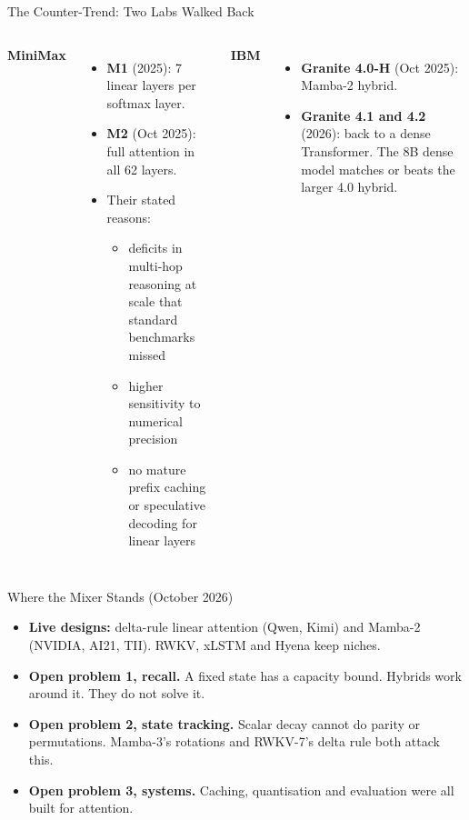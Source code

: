 \begin{frame}{The Counter-Trend: Two Labs Walked Back}
    \begin{columns}[T,onlytextwidth]
        \textbf{MiniMax}
        \begin{itemize}\itemsep0.3em
            \item \textbf{M1} (2025): 7 linear layers per softmax layer.
            \item \textbf{M2} (Oct 2025): \alert{full attention in all 62 layers}.
            \item Their stated reasons:
            \begin{itemize}\itemsep0.2em
                \item deficits in multi-hop reasoning at scale that standard benchmarks missed
                \item higher sensitivity to numerical precision
                \item no mature prefix caching or speculative decoding for linear layers
            \end{itemize}
        \end{itemize}
        \textbf{IBM}
        \begin{itemize}\itemsep0.3em
            \item \textbf{Granite 4.0-H} (Oct 2025): Mamba-2 hybrid.
            \item \textbf{Granite 4.1 and 4.2} (2026): back to a dense Transformer. The 8B dense model matches or beats the larger 4.0 hybrid.
        \end{itemize}
        \vspace{0.6em}
    \end{columns}
    \vspace{0.3em}
\end{frame}

\begin{frame}{Where the Mixer Stands (October 2026)}
    \begin{itemize}\itemsep0.55em
        \item \textbf{Live designs:} delta-rule linear attention (Qwen, Kimi) and Mamba-2 (NVIDIA, AI21, TII). RWKV, xLSTM and Hyena keep niches.
        \item \textbf{Open problem 1, recall.} A fixed state has a capacity bound. Hybrids work around it. They do not solve it.
        \item \textbf{Open problem 2, state tracking.} Scalar decay cannot do parity or permutations. Mamba-3's rotations and RWKV-7's delta rule both attack this.
        \item \textbf{Open problem 3, systems.} Caching, quantisation and evaluation were all built for attention.
    \end{itemize}
    \vspace{0.2em}
\end{frame}
